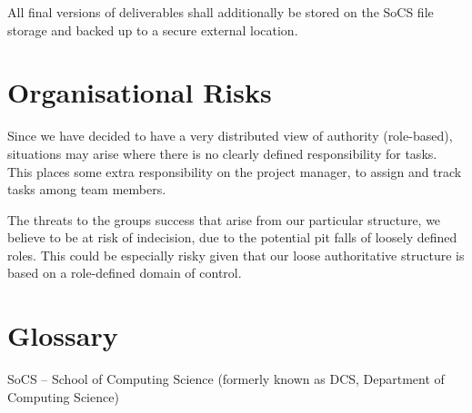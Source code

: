 \documentclass{l3deliverable}
\begin{document}
All final versions of deliverables shall additionally be stored on the SoCS file storage and backed up to a secure external location.


\section{Organisational Risks}

Since we have decided to have a very distributed view of authority (role-based), situations may arise where there is no clearly defined responsibility for tasks. This places some extra responsibility on the project manager, to assign and track tasks among team members.

The threats to the groups success that arise from our particular structure, we believe to be at risk of indecision, due to the potential pit falls of loosely defined roles. This could be especially risky given that our loose authoritative structure is based on a role-defined domain of control.


\appendix

\section{Glossary}

SoCS -- School of Computing Science (formerly known as DCS, Department of Computing Science)


\end{document}
